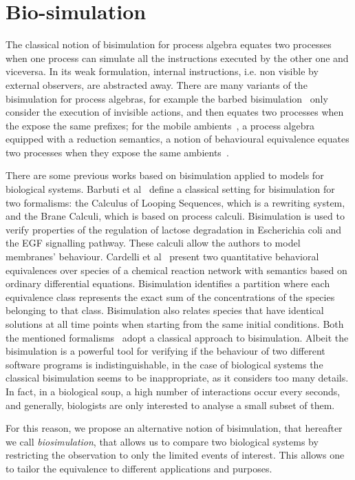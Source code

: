 \section{Bio-simulation}
\label{sec:biosimulation}

The classical notion of bisimulation for process algebra equates two processes
when one process can simulate all the instructions executed by the other one and viceversa.
In its weak formulation, internal instructions, i.e. non visible by external observers,
are abstracted away. 
There are many variants of the bisimulation for process algebras,  for example the
barbed bisimulation~\cite{10.1007/3-540-55719-9_114} only consider the execution of invisible actions, and then equates two processes when the expose the same prefixes; for the mobile ambients~\cite{CardelliG00}, a process algebra equipped with a reduction semantics, a notion of
behavioural equivalence equates two processes when they expose the same ambients~\cite{GC03}. 

There are some previous works based on bisimulation applied to models for biological systems. Barbuti et al~\cite{BMMT08} define a classical setting for bisimulation for two formalisms: the Calculus of Looping Sequences, which is a rewriting system, and the Brane Calculi, which is based on process calculi.
Bisimulation is used to verify properties of the regulation of lactose degradation in
Escherichia coli and the EGF signalling pathway. These calculi allow the authors to model membranes' behaviour.
Cardelli et al~\cite{CTTV15} present two quantitative behavioral equivalences over species of a 
chemical reaction network with semantics based on ordinary differential equations.
Bisimulation identifies a partition where each equivalence class represents the exact sum of the concentrations of the species belonging to that class.
Bisimulation also relates species that have identical solutions at all time points when starting from the same initial conditions.
Both the mentioned formalisms~\cite{BMMT08,CTTV15} adopt a classical approach to bisimulation. 
Albeit the bisimulation is a powerful tool for verifying if the behaviour of two different software 
programs is indistinguishable, in the case of biological systems the classical bisimulation seems to be inappropriate, as it considers too many details.
In fact, in a biological soup, a high number of interactions occur every seconds, and generally, biologists
are only interested to analyse a small subset of them.

For this reason, we propose an alternative notion of bisimulation, that hereafter we call \emph{biosimulation},
that allows us  to compare two biological systems by restricting the observation to only the limited events of interest.
This allows one to tailor the equivalence to different applications and purposes. 

